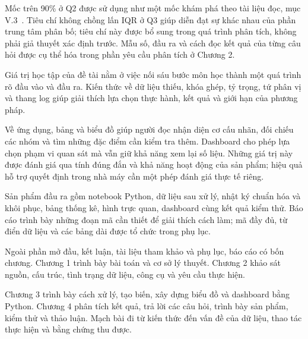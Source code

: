 Mốc trên 90\% ở Q2 được sử dụng như một mốc khám phá theo tài liệu đọc, mục V.3~\cite{reading}. Tiêu chí không chồng lấn IQR ở Q3 giúp diễn đạt sự khác nhau của phần trung tâm phân bố; tiêu chí này được bổ sung trong quá trình phân tích, không phải giả thuyết xác định trước. Mẫu số, đầu ra và cách đọc kết quả của từng câu hỏi được cụ thể hóa trong phần yêu cầu phân tích ở Chương 2.


Giá trị học tập của đề tài nằm ở việc nối sáu bước môn học thành một quá trình rõ đầu vào và đầu ra. Kiến thức về dữ liệu thiếu, khóa ghép, tỷ trọng, tứ phân vị và thang log giúp giải thích lựa chọn thực hành, kết quả và giới hạn của phương pháp.

Về ứng dụng, bảng và biểu đồ giúp người đọc nhận diện cơ cấu nhãn, đối chiếu các nhóm và tìm những đặc điểm cần kiểm tra thêm. Dashboard cho phép lựa chọn phạm vi quan sát mà vẫn giữ khả năng xem lại số liệu. Những giá trị này được đánh giá qua tính đúng đắn và khả năng hoạt động của sản phẩm; hiệu quả hỗ trợ quyết định trong nhà máy cần một phép đánh giá thực tế riêng.

Sản phẩm đầu ra gồm notebook Python, dữ liệu sau xử lý, nhật ký chuẩn hóa và khôi phục, bảng thống kê, hình trực quan, dashboard cùng kết quả kiểm thử. Báo cáo trình bày những đoạn mã cần thiết để giải thích cách làm; mã đầy đủ, từ điển dữ liệu và các bảng dài được tổ chức trong phụ lục.


Ngoài phần mở đầu, kết luận, tài liệu tham khảo và phụ lục, báo cáo có bốn chương. Chương 1 trình bày bài toán và cơ sở lý thuyết. Chương 2 khảo sát nguồn, cấu trúc, tình trạng dữ liệu, công cụ và yêu cầu thực hiện.

Chương 3 trình bày cách xử lý, tạo biến, xây dựng biểu đồ và dashboard bằng Python. Chương 4 phân tích kết quả, trả lời các câu hỏi, trình bày sản phẩm, kiểm thử và thảo luận. Mạch bài đi từ kiến thức đến vấn đề của dữ liệu, thao tác thực hiện và bằng chứng thu được.
